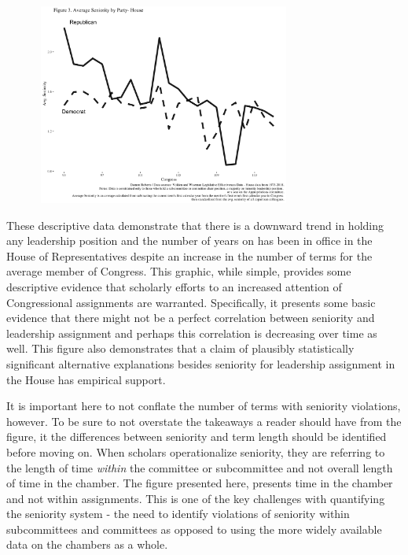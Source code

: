 \documentclass [12pt]{article}
\begin{document}
{{\includegraphics[height=250,width=400]{../figures/avg-house-seniority-macro.png}

These descriptive data demonstrate that there is a downward trend in holding any leadership position and the number of years on has been in office in the House of Representatives despite an increase in the number of terms for the average member of Congress. This graphic, while simple, provides some descriptive evidence that scholarly efforts to an increased attention of Congressional assignments are warranted. Specifically, it presents some basic evidence that there might not be a perfect correlation between seniority and leadership assignment and perhaps this correlation is decreasing over time as well. This figure also demonstrates that a claim of plausibly statistically significant alternative explanations besides seniority for leadership assignment in the House has empirical support. 

It is important here to not conflate the number of terms with seniority violations, however. To be sure to not overstate the takeaways a reader should have from the figure, it the differences between seniority and term length should be identified before moving on. When scholars operationalize seniority, they are referring to the length of time \textit{within} the committee or subcommittee and not overall length of time in the chamber. The figure presented here, presents time in the chamber and not within assignments. This is one of the key challenges with quantifying the seniority system - the need to identify violations of seniority within subcommittees and committees as opposed to using the more widely available data on the chambers as a whole. 

}}
\end{document}
